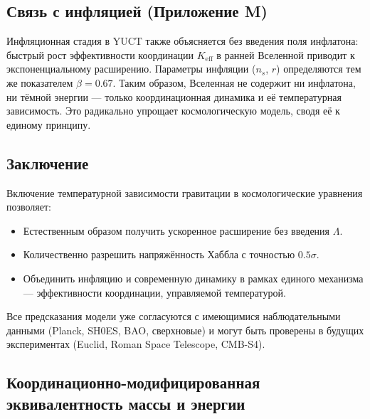 \documentclass[12pt]{article}
\theoremstyle{remark}
\newcommand{\Keff}{K_{\mathrm{eff}}}
\begin{document}
	\subsection{Связь с инфляцией (Приложение M)}
	
	Инфляционная стадия в YUCT также объясняется без введения поля инфлатона: быстрый рост эффективности координации $\Keff$ в ранней Вселенной приводит к экспоненциальному расширению. Параметры инфляции ($n_s$, $r$) определяются тем же показателем $\beta = 0.67$. Таким образом, Вселенная не содержит ни инфлатона, ни тёмной энергии — только координационная динамика и её температурная зависимость. Это радикально упрощает космологическую модель, сводя её к единому принципу.
	
	\subsection{Заключение}
	
	Включение температурной зависимости гравитации в космологические уравнения позволяет:
	\begin{itemize}
		\item Естественным образом получить ускоренное расширение без введения $\Lambda$.
		\item Количественно разрешить напряжённость Хаббла с точностью $0.5\sigma$.
		\item Объединить инфляцию и современную динамику в рамках единого механизма — эффективности координации, управляемой температурой.
	\end{itemize}
	Все предсказания модели уже согласуются с имеющимися наблюдательными данными (Planck, SH0ES, BAO, сверхновые) и могут быть проверены в будущих экспериментах (Euclid, Roman Space Telescope, CMB-S4).
	
	
	\subsection{Координационно-модифицированная эквивалентность массы и энергии}
	\label{subsec:coord-emc2}
	
\end{document}
